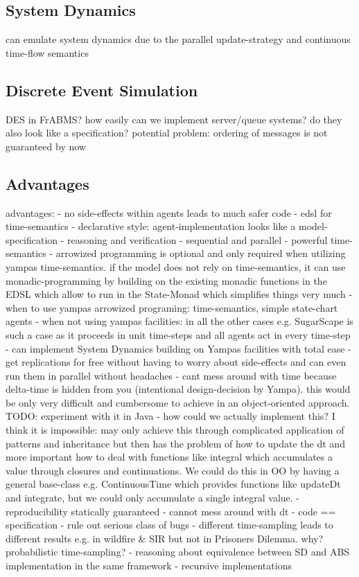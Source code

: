 \subsection{System Dynamics}
can emulate system dynamics due to the parallel update-strategy and continuous time-flow semantics

\subsection{Discrete Event Simulation}
DES in FrABMS? how easily can we implement server/queue systems? do they also look like a specification? potential problem: ordering of messages is not guaranteed by now

\subsection{Advantages}
advantages:
	- no side-effects within agents leads to much safer code
	- edsl for time-semantics
	- declarative style: agent-implementation looks like a model-specification
	- reasoning and verification
	- sequential and parallel
	- powerful time-semantics
	- arrowized programming is optional and only required when utilizing yampas time-semantics. if the model does not rely on time-semantics, it can use monadic-programming by building on the existing monadic functions in the EDSL which allow to run in the State-Monad which simplifies things very much
	- when to use yampas arrowized programing: time-semantics, simple state-chart agents 
	- when not using yampas facilities: in all the other cases e.g. SugarScape is such a case as it proceeds in unit time-steps and all agents act in every time-step
	- can implement System Dynamics building on Yampas facilities with total ease	
	- get replications for free without having to worry about side-effects and can even run them in parallel without headaches
	- cant mess around with time because delta-time is hidden from you (intentional design-decision by Yampa). this would be only very difficult and cumbersome to achieve in an object-oriented approach. TODO: experiment with it in Java - how could we actually implement this? I think it is impossible: may only achieve this through complicated application of patterns and inheritance but then has the problem of how to update the dt and more important how to deal with functions like integral which accumulates a value through closures and continuations. We could do this in OO by having a general base-class e.g. ContinuousTime which provides functions like updateDt and integrate, but we could only accumulate a single integral value.
	- reproducibility statically guaranteed
	- cannot mess around with dt
	- code == specification
	- rule out serious class of bugs
	- different time-sampling leads to different results e.g. in wildfire \& SIR but not in Prisoners Dilemma. why? probabilistic time-sampling?
	- reasoning about equivalence between SD and ABS implementation in the same framework
	- recursive implementations
	
